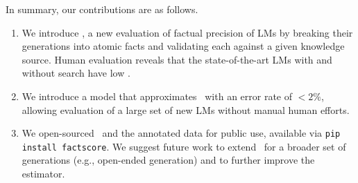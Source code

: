 

In summary, our contributions are as follows.
\vspace{-.3em}
\begin{enumerate}[leftmargin=15pt]\itemsep -.2em
    \item We introduce \ours, a new evaluation of factual precision of LMs by breaking their generations into atomic facts and validating each against a given knowledge source. Human evaluation reveals that the state-of-the-art LMs with and without search have low \ourScores. %
    \item We introduce a model that approximates \ours\ with an error rate of $<2\%$, allowing evaluation of a large set of new LMs without manual human efforts.
    \item We open-sourced \ours\ and the annotated data for public use, available via \texttt{pip install factscore}.
    We suggest future work to extend \ours\ for a broader set of generations (e.g., open-ended generation) and to further improve the estimator.
\end{enumerate}
